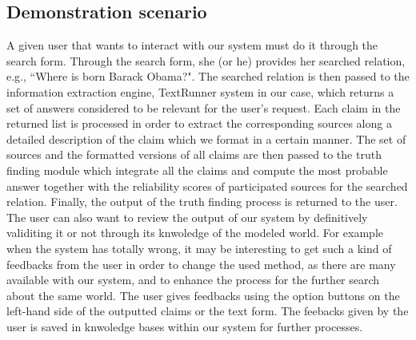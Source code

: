 \subsection{Demonstration scenario}
A given user that wants to interact with our system
must do it through the search form. Through the search
form, she (or he) provides her searched relation, e.g.,
``Where is born Barack Obama?".
The searched relation is then 
passed to the information extraction engine,  TextRunner system
in our case, which returns a set of answers considered to be 
relevant for the user's request. Each claim in the returned list is
processed in order to extract the corresponding sources along a detailed
description of the claim which we format in a certain manner. The 
set of sources and the formatted versions of all claims are then passed
to the truth finding module which integrate all the claims and compute the
most probable answer together with the reliability scores of participated 
sources for the searched relation. Finally, the output of the truth finding
process is returned to the user. The user can also want to review the output
of our system by definitively validiting it or not through its knwoledge of the
modeled world. For example when the system has totally wrong, it may be interesting
to get such a kind of feedbacks from the user in order to change the used method, as
there are many available with our system, and to enhance the process for the further 
search about the same world. The user gives feedbacks using the option buttons on the 
left-hand side of the outputted claims or the text form. The feebacks given by the user
is saved in knwoledge bases within our system for further processes.
